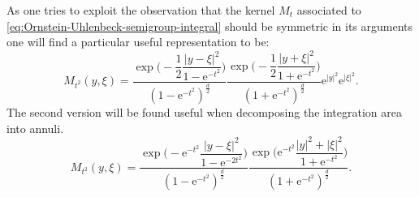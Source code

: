\documentclass[a4paper,oneside,10pt]{amsproc}
\theoremstyle{plain}
\theoremstyle{remark}
\theoremstyle{definition}
\newcommand{\e}{\mathrm{e}} %
\begin{document}
As one tries to exploit the observation that the kernel $M_t$
associated to \eqref{eq:Ornstein-Uhlenbeck-semigroup-integral} should be
symmetric in its arguments one will find a particular useful
representation to be:
\begin{equation}
  \label{eq:Mehler-kernel-1}
  M_{t^2}(y, \xi) = \frac{\exp\biggl(-\dfrac12 \dfrac{|y - \xi|^2}{1
      - \e^{-t^2}}  \biggr)}{(1 - \e^{-t^2})^{\frac{d}2}}
  \frac{\exp\biggl(-\dfrac12 \dfrac{|y + \xi|^2}{1 + \e^{-t^2}}
    \biggr)}{(1 + \e^{-t^2})^{\frac{d}2}} \e^{|y|^2} \e^{|\xi|^2}.
\end{equation}
The second version will be found useful when decomposing the
integration area into annuli.
\begin{equation}
  \label{eq:Mehler-kernel-2}
  M_{t^2}(y, \xi) = \frac{\exp\biggl(-\e^{-t^2} \dfrac{|y - \xi|^2}{1
      - \e^{-2 t^2}}  \biggr)}{(1 - \e^{-t^2})^{\frac{d}2}}
  \frac{\exp\biggl(\e^{-t^2} \dfrac{|y|^2 + |\xi|^2}{1 + \e^{-t^2}}
    \biggr)}{(1 + \e^{-t^2})^{\frac{d}2}}.
\end{equation}
\end{document}
